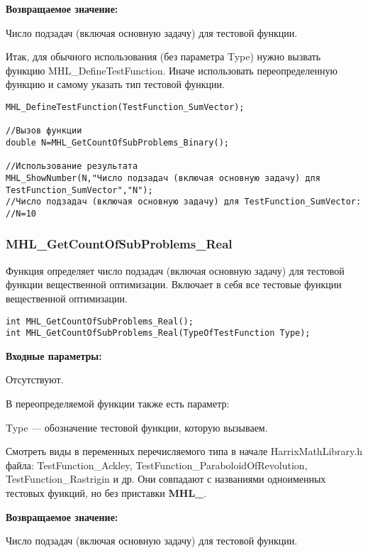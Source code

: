 \documentclass[a4paper,12pt]{article}
\begin{document}
\textbf{Возвращаемое значение:}
 
Число подзадач (включая основную задачу) для тестовой функции.

Итак, для обычного использования (без параметра Type) нужно вызвать функцию MHL\_DefineTestFunction. Иначе использовать переопределенную функцию и самому указать тип тестовой функции.


\begin{lstlisting}[label=code_use_MHL_GetCountOfSubProblems_Binary,caption=Пример использования]
MHL_DefineTestFunction(TestFunction_SumVector);

//Вызов функции
double N=MHL_GetCountOfSubProblems_Binary();

//Использование результата
MHL_ShowNumber(N,"Число подзадач (включая основную задачу) для TestFunction_SumVector","N");
//Число подзадач (включая основную задачу) для TestFunction_SumVector:
//N=10
\end{lstlisting}

\subsubsection{MHL\_GetCountOfSubProblems\_Real}\label{MHL_GetCountOfSubProblems_Real}

Функция определяет число подзадач (включая основную задачу) для тестовой функции вещественной оптимизации. Включает в себя все тестовые функции вещественной оптимизации.


\begin{lstlisting}[label=code_syntax_MHL_GetCountOfSubProblems_Real,caption=Синтаксис]
int MHL_GetCountOfSubProblems_Real();
int MHL_GetCountOfSubProblems_Real(TypeOfTestFunction Type);
\end{lstlisting}

\textbf{Входные параметры:}

Отсутствуют.

В переопределяемой функции также есть параметр:
  
Type --- обозначение тестовой функции, которую вызываем. 

Смотреть виды в переменных перечисляемого типа в начале HarrixMathLibrary.h файла: TestFunction\_Ackley, TestFunction\_ParaboloidOfRevolution, TestFunction\_Rastrigin и др. Они совпадают с названиями одноименных тестовых функций, но без приставки \textbf{MHL\_}.

\textbf{Возвращаемое значение:}
 
Число подзадач (включая основную задачу) для тестовой функции.
\end{document}
